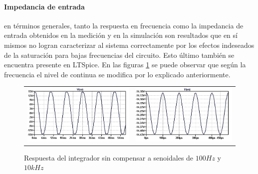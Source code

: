 \paragraph*{Impedancia de entrada} en t\'erminos generales, tanto la respuesta en frecuencia como la impedancia de entrada
obtenidos en la medici\'on y en la simulaci\'on son resultados que en s\'i mismos no logran caracterizar al sistema correctamente por los efectos indeseados
de la saturaci\'on para bajas frecuencias del circuito. Esto \'ultimo tambi\'en se encuentra presente en LTSpice. En las figuras \ref{fig:integrador_simulacion} se puede observar
que seg\'un la frecuencia el nivel de continua se modifica por lo explicado anteriormente.

\begin{figure}[H]
	\centering
	\begin{tabular}{c c}
		\includegraphics[scale=0.55]{../EJ4/Integrador/Simulaciones/Seno100.png} &
		\includegraphics[scale=0.55]{../EJ4/Integrador/Simulaciones/Seno10k.png}
	\end{tabular}
	\caption{Respuesta del integrador sin compensar a senoidales de $100Hz$ y $10kHz$}
	\label{fig:integrador_simulacion}
\end{figure}

